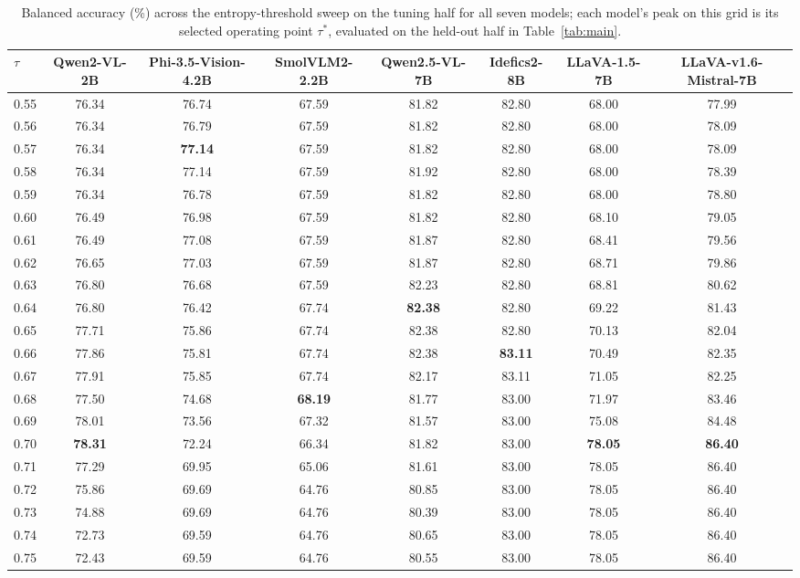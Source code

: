 \documentclass{ieeeaccess}
\begin{document}
\begin{table}[!tp]
\caption{Balanced accuracy (\%) across the entropy-threshold sweep on the tuning half for all seven models; each model's peak on this grid is its selected operating point $\tau^{*}$, evaluated on the held-out half in Table~\ref{tab:main}.}\label{tab:sweep}
\begin{tabular*}{\textwidth}{@{\extracolsep\fill}lccccccc@{}}
\toprule
$\tau$ & \textbf{Qwen2-VL-2B} & \textbf{Phi-3.5-Vision-4.2B} & \textbf{SmolVLM2-2.2B} & \textbf{Qwen2.5-VL-7B} & \textbf{Idefics2-8B} & \textbf{LLaVA-1.5-7B} & \textbf{LLaVA-v1.6-Mistral-7B}\\
\midrule
0.55 & 76.34 & 76.74 & 67.59 & 81.82 & 82.80 & 68.00 & 77.99 \\
0.56 & 76.34 & 76.79 & 67.59 & 81.82 & 82.80 & 68.00 & 78.09 \\
0.57 & 76.34 & \textbf{77.14} & 67.59 & 81.82 & 82.80 & 68.00 & 78.09 \\
0.58 & 76.34 & 77.14 & 67.59 & 81.92 & 82.80 & 68.00 & 78.39 \\
0.59 & 76.34 & 76.78 & 67.59 & 81.82 & 82.80 & 68.00 & 78.80 \\
0.60 & 76.49 & 76.98 & 67.59 & 81.82 & 82.80 & 68.10 & 79.05 \\
0.61 & 76.49 & 77.08 & 67.59 & 81.87 & 82.80 & 68.41 & 79.56 \\
0.62 & 76.65 & 77.03 & 67.59 & 81.87 & 82.80 & 68.71 & 79.86 \\
0.63 & 76.80 & 76.68 & 67.59 & 82.23 & 82.80 & 68.81 & 80.62 \\
0.64 & 76.80 & 76.42 & 67.74 & \textbf{82.38} & 82.80 & 69.22 & 81.43 \\
0.65 & 77.71 & 75.86 & 67.74 & 82.38 & 82.80 & 70.13 & 82.04 \\
0.66 & 77.86 & 75.81 & 67.74 & 82.38 & \textbf{83.11} & 70.49 & 82.35 \\
0.67 & 77.91 & 75.85 & 67.74 & 82.17 & 83.11 & 71.05 & 82.25 \\
0.68 & 77.50 & 74.68 & \textbf{68.19} & 81.77 & 83.00 & 71.97 & 83.46 \\
0.69 & 78.01 & 73.56 & 67.32 & 81.57 & 83.00 & 75.08 & 84.48 \\
0.70 & \textbf{78.31} & 72.24 & 66.34 & 81.82 & 83.00 & \textbf{78.05} & \textbf{86.40} \\
0.71 & 77.29 & 69.95 & 65.06 & 81.61 & 83.00 & 78.05 & 86.40 \\
0.72 & 75.86 & 69.69 & 64.76 & 80.85 & 83.00 & 78.05 & 86.40 \\
0.73 & 74.88 & 69.69 & 64.76 & 80.39 & 83.00 & 78.05 & 86.40 \\
0.74 & 72.73 & 69.59 & 64.76 & 80.65 & 83.00 & 78.05 & 86.40 \\
0.75 & 72.43 & 69.59 & 64.76 & 80.55 & 83.00 & 78.05 & 86.40 \\
\bottomrule
\end{tabular*}
\end{table}
\end{document}
